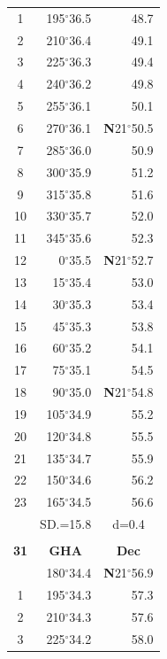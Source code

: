 \documentclass[10pt, a4paper]{report}
\begin{document}
\begin{scriptsize}
\begin{tabular*}{0.2\textwidth}[t]{@{\extracolsep{\fill}}|c|rr|}
1 & 195$^\circ$36.5 & 48.7\\
2 & 210$^\circ$36.4 & 49.1\\
3 & 225$^\circ$36.3 & \raisebox{0.24ex}{\boldmath$\cdot$~\boldmath$\cdot$~~}49.4\\
4 & 240$^\circ$36.2 & 49.8\\
5 & 255$^\circ$36.1 & 50.1\\[2Pt]
6 & 270$^\circ$36.1 & \textbf{N}21$^\circ$50.5\\
7 & 285$^\circ$36.0 & 50.9\\
8 & 300$^\circ$35.9 & 51.2\\
9 & 315$^\circ$35.8 & \raisebox{0.24ex}{\boldmath$\cdot$~\boldmath$\cdot$~~}51.6\\
10 & 330$^\circ$35.7 & 52.0\\
11 & 345$^\circ$35.6 & 52.3\\[2Pt]
12 & 0$^\circ$35.5 & \textbf{N}21$^\circ$52.7\\
13 & 15$^\circ$35.4 & 53.0\\
14 & 30$^\circ$35.3 & 53.4\\
15 & 45$^\circ$35.3 & \raisebox{0.24ex}{\boldmath$\cdot$~\boldmath$\cdot$~~}53.8\\
16 & 60$^\circ$35.2 & 54.1\\
17 & 75$^\circ$35.1 & 54.5\\[2Pt]
18 & 90$^\circ$35.0 & \textbf{N}21$^\circ$54.8\\
19 & 105$^\circ$34.9 & 55.2\\
20 & 120$^\circ$34.8 & 55.5\\
21 & 135$^\circ$34.7 & \raisebox{0.24ex}{\boldmath$\cdot$~\boldmath$\cdot$~~}55.9\\
22 & 150$^\circ$34.6 & 56.2\\
23 & 165$^\circ$34.5 & 56.6\\
\hline
\rule{0pt}{2.4ex} & \multicolumn{1}{c}{SD.=15.8} & \multicolumn{1}{c|}{d=0.4}\\
\hline
\multicolumn{1}{c}{}\\[-0.5ex]\hline
\multicolumn{1}{|c|}{\rule{0pt}{2.6ex}\textbf{31}} & \multicolumn{1}{c}{\textbf{GHA}} & \multicolumn{1}{c|}{\textbf{Dec}}\\
\hline\rule{0pt}{2.6ex}\noindent
0 & 180$^\circ$34.4 & \textbf{N}21$^\circ$56.9\\
1 & 195$^\circ$34.3 & 57.3\\
2 & 210$^\circ$34.3 & 57.6\\
3 & 225$^\circ$34.2 & \raisebox{0.24ex}{\boldmath$\cdot$~\boldmath$\cdot$~~}58.0\\

\end{tabular*}
\end{scriptsize}
\end{document}
